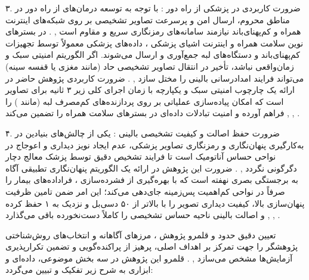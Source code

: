 

۳. ضرورت کاربردی در پزشکی از راه دور : با توجه به توسعه درمان‌های از راه دور در مناطق محروم، ارسال امن و پرسرعت تصاویر تشخیصی بر روی شبکه‌های اینترنت همراه و کم‌پهنای‌باند نیازمند سامانه‌های رمزنگاری سریع و مقاوم است , . در بسترهای نوین سلامت همراه  و اینترنت اشیای پزشکی ، داده‌های پزشکی معمولاً توسط تجهیزات کم‌پهنای‌باند و دستگاه‌های لبه  جمع‌آوری و ارسال می‌شوند. اگر الگوریتم امنیتی سبک و زمان‌واقعی نباشد، تأخیر در انتقال تصاویر تشخیصی حاد (مانند  مغزی یا  قفسه سینه) می‌تواند فرایند امدادرسانی بالینی را مختل سازد , . ضرورت کاربردی پژوهش حاضر در ارائه یک چارچوب امنیتی سبک و یکپارچه با زمان اجرای کلی زیر ۳ ثانیه برای تصاویر  است که امکان پیاده‌سازی عملیاتی بر روی پردازنده‌های کم‌مصرف لبه (مانند ) را فراهم آورده و امنیت تبادلات داده‌ای در بسترهای سلامت همراه را تضمین می‌کند , , .\par



۴. ضرورت حفظ اصالت و کیفیت تشخیصی بالینی : یکی از چالش‌های بنیادین در به‌کارگیری پنهان‌نگاری و رمزنگاری تصاویر پزشکی، عدم ایجاد نویز دیداری و اعوجاج در نواحی حساس آناتومیک  است تا فرایند تشخیص دقیق توسط پزشک معالج دچار دگرگونی نگردد , . ضرورت این پژوهش در ارائه یک الگوریتم پنهان‌نگاری تطبیقی آگاه به برجستگی بصری  نهفته است که با بهره‌گیری از فشرده‌سازی ، فراداده‌های بیمار را صرفاً در نواحی کم‌اهمیت پس‌زمینه جای‌دهی می‌کند؛ این امر ضمن تامین ظرفیت پنهان‌سازی بالا، کیفیت دیداری تصویر را با  بالاتر از ۵۰ دسی‌بل و  نزدیک به ۱ حفظ کرده و اصالت بالینی ناحیه حساس تشخیصی را کاملاً دست‌نخورده باقی می‌گذارد , , .\par





تعیین دقیق حدود و قلمرو پژوهش ، مرزهای آگاهانه و انتخاب‌های روش‌شناختی پژوهشگر را جهت تمرکز بر اهداف اصلی، پرهیز از پراکنده‌گویی و تضمین تکرارپذیری آزمایش‌ها مشخص می‌سازد , . قلمرو این پژوهش در سه بخش موضوعی، داده‌ای و ابزاری به شرح زیر تفکیک و تبیین می‌گردد:\par

